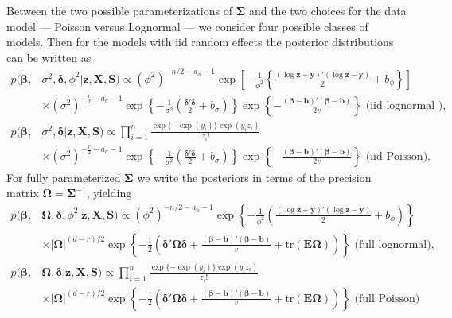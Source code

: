 \documentclass[12pt]{article}
\begin{document}
Between the two possible parameterizations of $\bm{\Sigma}$ and the two choices for the data model --- Poisson versus Lognormal --- we consider four possible classes of models. Then for the models with iid random effects the posterior distributions can be written as
\begin{align}
p(\bm{\beta},& \sigma^2, \bm{\delta}, \phi^2|\bm{z}, \bm{X}, \bm{S}) \propto (\phi^2)^{-n/2 - a_\phi - 1}\exp\left[-\frac{1}{\phi^2}\left\{\frac{(\log\bm{z} - \bm{y})'(\log\bm{z} - \bm{y})}{2} + b_\phi\right\}\right] \nonumber\\
&\times (\sigma^2)^{-\frac{r}{2} - a_{\sigma}-1}\exp\left\{-\frac{1}{\sigma^2}\left(\frac{\bm{\delta}'\bm{\delta}}{2} + b_{\sigma}\right)\right\}\exp\left\{-\frac{(\bm{\beta} - \bm{b})'(\bm{\beta} - \bm{b})}{2v}\right\}\mbox{\ \ \ \ \ (iid lognormal ),}\label{eq:iidnormpost}\\
p(\bm{\beta},& \sigma^2, \bm{\delta}|\bm{z}, \bm{X}, \bm{S}) \propto \prod_{i=1}^n \frac{\exp\{-\exp(y_i)\}\exp(y_iz_i)}{z_i!}  \nonumber\\
&\times (\sigma^2)^{-\frac{r}{2} - a_{\sigma}-1}\exp\left\{-\frac{1}{\sigma^2}\left(\frac{\bm{\delta}'\bm{\delta}}{2} + b_{\sigma}\right)\right\}\exp\left\{-\frac{(\bm{\beta} - \bm{b})'(\bm{\beta} - \bm{b})}{2v}\right\}\mbox{\ \ \ \ \ (iid Poisson).}\label{eq:iidpoispost}
\end{align}
For fully parameterized $\bm{\Sigma}$ we write the posteriors in terms of the precision matrix $\bm{\Omega} = \bm{\Sigma}^{-1}$, yielding
\begin{align}
p(\bm{\beta},& \bm{\Omega}, \bm{\delta}, \phi^2|\bm{z}, \bm{X}, \bm{S}) \propto (\phi^2)^{-n/2 - a_\phi - 1}\exp\left\{-\frac{1}{\phi^2}\left(\frac{(\log\bm{z} - \bm{y})'(\log\bm{z} - \bm{y})}{2} + b_\phi\right)\right\} \nonumber\\
&\times |\bm{\Omega}|^{(d - r)/2}\exp\left\{-\frac{1}{2}\left(\bm{\delta}'\bm{\Omega}\bm{\delta}+\frac{(\bm{\beta} - \bm{b})'(\bm{\beta} - \bm{b})}{v} + \mathrm{tr}(\bm{E}\bm{\Omega})\right)\right\}\mbox{\ \ \ \ \ (full lognormal),}\label{eq:fullnormpostprec}\\
p(\bm{\beta},& \bm{\Omega}, \bm{\delta}|\bm{z}, \bm{X}, \bm{S}) \propto \prod_{i=1}^n \frac{\exp\{-\exp(y_i)\}\exp(y_iz_i)}{z_i!}  \nonumber\\
&\times |\bm{\Omega}|^{(d - r)/2}\exp\left\{-\frac{1}{2}\left(\bm{\delta}'\bm{\Omega}\bm{\delta}+\frac{(\bm{\beta} - \bm{b})'(\bm{\beta} - \bm{b})}{v} + \mathrm{tr}(\bm{E}\bm{\Omega})\right)\right\}\mbox{\ \ \ \ \ (full Poisson)}\label{eq:fullpoispostprec}
\end{align}
\end{document}
